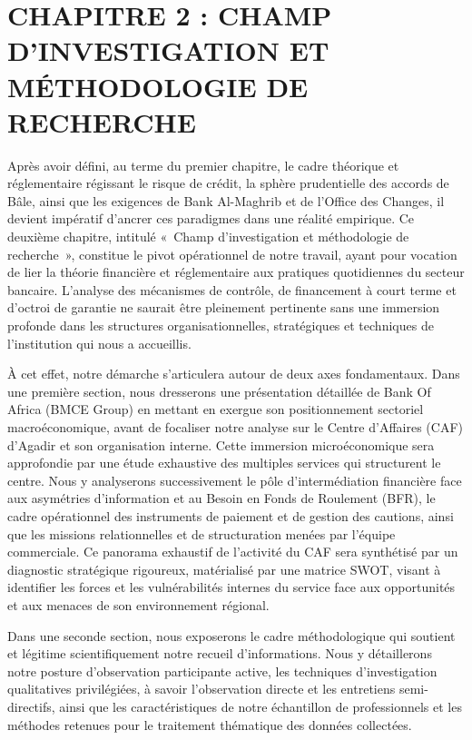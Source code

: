 \documentclass[12pt,a4paper]{report}
\begin{document}
\chapter*{CHAPITRE 2 : CHAMP D'INVESTIGATION ET MÉTHODOLOGIE DE RECHERCHE}

Après avoir défini, au terme du premier chapitre, le cadre théorique et réglementaire régissant le risque de crédit, la sphère prudentielle des accords de Bâle, ainsi que les exigences de Bank Al-Maghrib et de l'Office des Changes, il devient impératif d'ancrer ces paradigmes dans une réalité empirique. Ce deuxième chapitre, intitulé «~Champ d'investigation et méthodologie de recherche~», constitue le pivot opérationnel de notre travail, ayant pour vocation de lier la théorie financière et réglementaire aux pratiques quotidiennes du secteur bancaire. L'analyse des mécanismes de contrôle, de financement à court terme et d'octroi de garantie ne saurait être pleinement pertinente sans une immersion profonde dans les structures organisationnelles, stratégiques et techniques de l'institution qui nous a accueillis.

À cet effet, notre démarche s'articulera autour de deux axes fondamentaux. Dans une première section, nous dresserons une présentation détaillée de Bank Of Africa (BMCE Group) en mettant en exergue son positionnement sectoriel macroéconomique, avant de focaliser notre analyse sur le Centre d'Affaires (CAF) d'Agadir et son organisation interne. Cette immersion microéconomique sera approfondie par une étude exhaustive des multiples services qui structurent le centre. Nous y analyserons successivement le pôle d'intermédiation financière face aux asymétries d'information et au Besoin en Fonds de Roulement (BFR), le cadre opérationnel des instruments de paiement et de gestion des cautions, ainsi que les missions relationnelles et de structuration menées par l'équipe commerciale. Ce panorama exhaustif de l'activité du CAF sera synthétisé par un diagnostic stratégique rigoureux, matérialisé par une matrice SWOT, visant à identifier les forces et les vulnérabilités internes du service face aux opportunités et aux menaces de son environnement régional.

Dans une seconde section, nous exposerons le cadre méthodologique qui soutient et légitime scientifiquement notre recueil d'informations. Nous y détaillerons notre posture d'observation participante active, les techniques d'investigation qualitatives privilégiées, à savoir l'observation directe et les entretiens semi-directifs, ainsi que les caractéristiques de notre échantillon de professionnels et les méthodes retenues pour le traitement thématique des données collectées.
\end{document}

